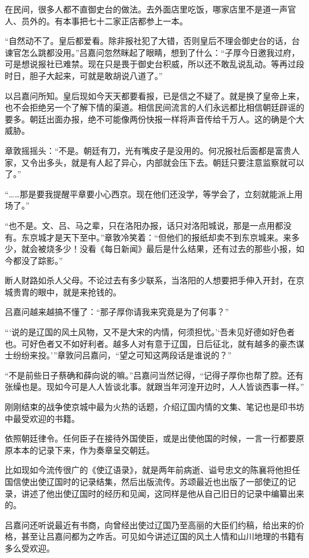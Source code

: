 在民间，很多人都不直御史台的做法。去外面店里吃饭，哪家店里不是道一声官人、员外的。有本事把七十二家正店都参上一本。

“自然动不了。皇后都爱看。除非报社犯了大错，否则皇后不理会御史台的话，台谏官怎么跳都没用。”吕嘉问忽然眯起了眼睛，想到了什么：“子厚今日邀我过府，可是想说报社已难禁。现在只是畏于御史台积威，所以还不敢乱说乱动。等再过段时日，胆子大起来，可就是敢胡说八道了。”

以吕嘉问所知。皇后现如今天天都要看报，已是信之不疑了。就是换了皇帝上来，也不会拒绝另一个了解下情的渠道。相信民间流言的人们永远都比相信朝廷辟谣的要多。朝廷出面办报，绝不可能像两份快报一样将声音传给千万人。这的确是个大威胁。

章敦摇摇头：“不是。朝廷有刀，光有嘴皮子是没用的。何况报社后面都是富贵人家，又令出多头，就是有人起了异心，内部就会压下去。朝廷只要注意监察就可以了。”

“……那是要我提醒平章要小心西京。现在他们还没学，等学会了，立刻就能派上用场了。”

“也不是。文、吕、马之辈，只在洛阳办报，话只对洛阳城说，那是一点用都没有。东京城才是天下至中。”章敦冷笑着：“但他们的报纸却卖不到东京城来。来多少，就会被烧多少！没看《每日新闻》最后是什么结果，还有过去的那些小报，如今都没了踪影。”

断人财路如杀人父母。不论过去有多少联系，当洛阳的人想要把手伸入开封，在京城贵胄的眼中，就是来抢钱的。

吕嘉问越来越搞不懂了：“那子厚你请我来究竟是为了何事？”

“‘说的是辽国的风土风物，又不是大宋的内情，何须担忧。’‘吾未见好德如好色者也。可好色者又不如好利者。越多人对有意于辽国，日后征北，就有越多的豪杰谋士纷纷来投。’”章敦问吕嘉问，“望之可知这两段话是谁说的？”

“不是前些日子蔡确和薛向说的嘛。”吕嘉问当然记得，“记得子厚你也帮了腔。还有张缲也是。现如今可是人人皆谈北事。就跟当年河湟开边时，人人皆谈西事一样。”

刚刚结束的战争使京城中最为火热的话题，介绍辽国内情的文集、笔记也是印书坊中最受欢迎的书籍。

依照朝廷律令。任何臣子在接待外国使臣，或是出使他国的时候，一言一行都要原原本本的记录下来，作为奏章呈交朝廷。

比如现如今流传很广的《使辽语录》，就是两年前病逝、谥号忠文的陈襄将他担任国信使出使辽国时的记录结集，然后出版流传。苏颂最近也出版了一部使辽的记录，讲述了他出使辽国时的经历和见闻，这同样是他从自己旧日的记录中编纂出来的。

吕嘉问还听说最近有书商，向曾经出使过辽国乃至高丽的大臣们约稿，给出来的价格，甚至让吕嘉问都为之咋舌。可见如今讲述辽国的风土人情和山川地理的书籍有多么受欢迎。

